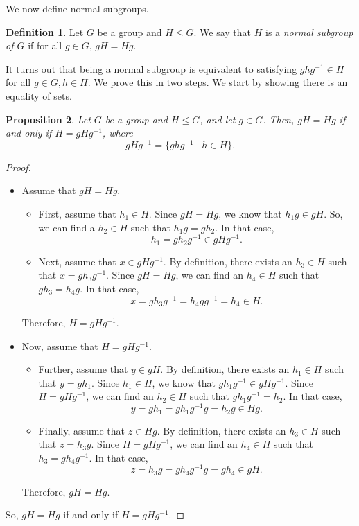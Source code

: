 \documentclass[a4paper, openany]{memoir}
\theoremstyle{definition}
\newtheorem{definition}{Definition}[section]
\theoremstyle{plain}
\newtheorem{proposition}[definition]{Proposition}
\begin{document}
We now define normal subgroups.
\begin{definition}
Let $G$ be a group and $H \leqslant G$. We say that $H$ is a \emph{normal subgroup of $G$} if for all $g \in G$, $gH = Hg$.
\end{definition}
\noindent It turns out that being a normal subgroup is equivalent to satisfying $ghg^{-1} \in H$ for all $g \in G, h \in H$. We prove this in two steps. We start by showing there is an equality of sets.
\begin{proposition}
Let $G$ be a group and $H \leqslant G$, and let $g \in G$. Then, $gH = Hg$ if and only if $H = gHg^{-1}$, where
\[gHg^{-1} = \{ghg^{-1} \mid h \in H\}.\]
\end{proposition}
\begin{proof}
\hspace*{0pt}
\begin{itemize}
    \item Assume that $gH = Hg$. 
    \begin{itemize}
        \item First, assume that $h_1 \in H$. Since $gH = Hg$, we know that $h_1g \in gH$. So, we can find a $h_2 \in H$ such that $h_1g = gh_2$. In that case, 
        \[h_1 = gh_2g^{-1} \in gHg^{-1}.\]
        \item Next, assume that $x \in gHg^{-1}$. By definition, there exists an $h_3 \in H$ such that $x = gh_3g^{-1}$. Since $gH = Hg$, we can find an $h_4 \in H$ such that $gh_3 = h_4g$. In that case,
        \[x = gh_3g^{-1} = h_4gg^{-1} = h_4 \in H.\]
    \end{itemize}
    Therefore, $H = gHg^{-1}$.
    
    \item Now, assume that $H = gHg^{-1}$.
    \begin{itemize}
        \item Further, assume that $y \in gH$. By definition, there exists an $h_1 \in H$ such that $y = gh_1$. Since $h_1 \in H$, we know that $gh_1g^{-1} \in gHg^{-1}$. Since $H = gHg^{-1}$, we can find an $h_2 \in H$ such that $gh_1g^{-1} = h_2$. In that case,
        \[y = gh_1 = gh_1g^{-1}g = h_2g \in Hg.\]
        \item Finally, assume that $z \in Hg$. By definition, there exists an $h_3 \in H$ such that $z = h_3g$. Since $H = gHg^{-1}$, we can find an $h_4 \in H$ such that $h_3 = gh_4g^{-1}$. In that case,
        \[z = h_3g = gh_4g^{-1}g = gh_4 \in gH.\]
    \end{itemize}
    Therefore, $gH = Hg$.
\end{itemize}
So, $gH = Hg$ if and only if $H = gHg^{-1}$.
\end{proof}
\end{document}
